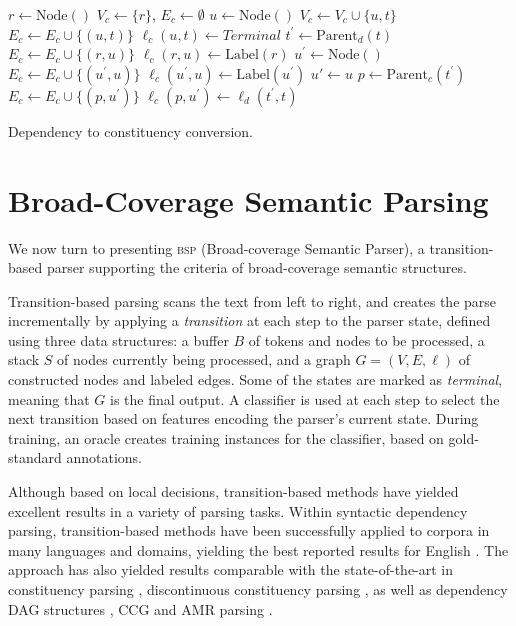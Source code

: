 \documentclass[11pt,letterpaper]{article}
\begin{document}
\begin{algorithm}[t]
  \small
 $r \leftarrow \mathrm{Node()}$\;
 $V_c \leftarrow \{r\}$,
 $E_c \leftarrow \emptyset$\;
  {
  $u \leftarrow \mathrm{Node()}$\;
  $V_c \leftarrow V_c \cup \{u, t\}$\;
  $E_c \leftarrow E_c \cup \{(u, t)\}$\;
  $\ell_c(u,t)\leftarrow\mathit{Terminal}$\;
  $t^\prime \leftarrow \mathrm{Parent}_d(t)$\;
   {
   $E_c \leftarrow E_c \cup \{(r, u)\}$\;
   $\ell_c(r, u) \leftarrow \mathrm{Label}(r)$\;
  } {
    {
    $u^\prime \leftarrow \mathrm{Node()}$\;
    $E_c \leftarrow E_c \cup \{(u^\prime, u)\}$\;
    $\ell_c(u^\prime, u) \leftarrow \mathrm{Label}(u^\prime)$\;
   } {
    $u' \leftarrow u$\;
   }
   $p \leftarrow \mathrm{Parent}_c(t^\prime)$\;
   $E_c \leftarrow E_c \cup \{(p, u^\prime)\}$\;
   $\ell_c(p, u^\prime) \leftarrow \ell_d(t^\prime, t)$\;
  }
 }
 \caption{\small Dependency to constituency conversion.}
 \label{alg:dep2con}
\end{algorithm}


\section{Broad-Coverage Semantic Parsing}\label{sec:direct_approach}

We now turn to presenting \textsc{bsp} (Broad-coverage Semantic Parser),
a transition-based parser supporting the criteria of broad-coverage
semantic structures.

Transition-based parsing \cite{Nivre03anefficient} scans the text from left to right,
and creates the parse incrementally by applying a \textit{transition}
at each step to the parser state,
defined using three data structures: a buffer $B$ of tokens and nodes to be processed,
a stack $S$ of nodes currently being processed,
and a graph $G=(V,E,\ell)$ of constructed nodes and labeled edges.
Some of the states are marked as \textit{terminal}, meaning that $G$ is the final output.
A classifier is used at each step to select the next transition based on features
encoding the parser's current state.
During training, an oracle creates training instances for the classifier,
based on gold-standard annotations.

Although based on local decisions, transition-based methods have yielded excellent
results in a variety of parsing tasks.
Within syntactic dependency parsing, transition-based methods
have been successfully applied to corpora in many languages and domains, yielding
the best reported results for English
\cite{dyer2015transition,andor2016globally,2016arXiv160304351K}.
The approach has also yielded results comparable with the state-of-the-art in
constituency parsing \cite{sagae2005classifier,zhang2009transition,zhu2013fast},
discontinuous constituency parsing \cite{maier2015discontinuous},
as well as dependency DAG structures
\cite{sagae2008shift,tokgoz2015transition}, CCG \cite{ambati2015incremental}
and AMR parsing \cite{wang2015transition}.
\end{document}
